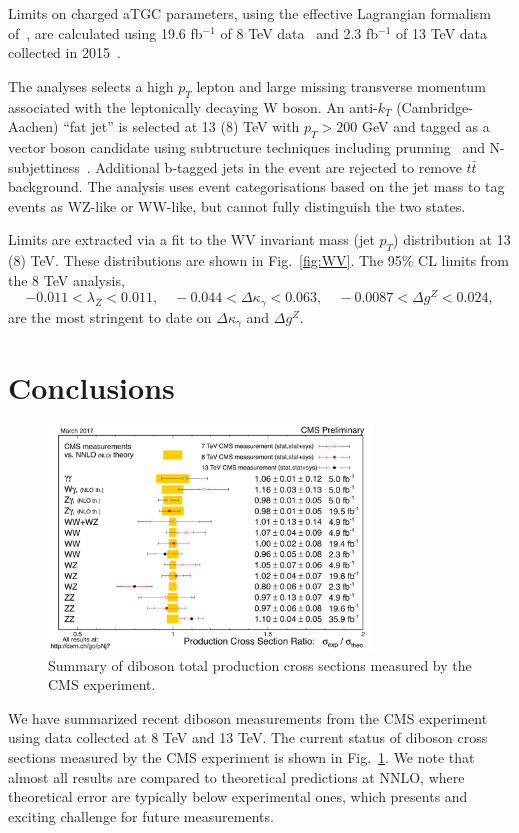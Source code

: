 \documentclass[10pt]{article}
\begin{document}
Limits on charged aTGC parameters, using the effective Lagrangian formalism 
of~\cite{Hagiwara:1993ck}, are calculated using 19.6 fb$^{-1}$ of 8 TeV 
data~\cite{CMS:2017ruh}
and 2.3 fb$^{-1}$ of 13 TeV data collected in 2015~\cite{Sirunyan:2017bey}.

The analyses selects a high $p_{T}$ lepton and large missing transverse momentum
associated with the leptonically decaying W boson. An anti-$k_{T}$
(Cambridge-Aachen) ``fat jet''  is selected at 13 (8) TeV with $p_{T} > 200$ GeV 
and tagged as a vector boson candidate using
subtructure techniques including prunning~\cite{Ellis:2009me} and 
N-subjettiness~\cite{Thaler:2010tr}. 
Additional b-tagged jets in the event are 
rejected to remove $t\bar{t}$ background. The analysis uses event categorisations
based on the jet mass to tag events as WZ-like or WW-like, but cannot fully 
distinguish the two states.

Limits are extracted via a fit to the WV invariant mass (jet $p_{T}$) distribution at 13 (8) TeV.
These distributions are shown in Fig.~\ref{fig:WV}.
The 95\% CL limits from the 8 TeV analysis,
\begin{equation}
  -0.011 < \lambda_{Z} < 0.011, \quad -0.044 < \Delta\kappa_{\gamma} < 0.063, \quad -0.0087 < \Delta g^{Z} < 0.024,
\end{equation}
are the most stringent to date on $\Delta\kappa_\gamma$ and $\Delta g^{Z}$.

\section{Conclusions}
\begin{figure}[htb]
  \centering
    \includegraphics[height=2.35in]{figures/CrossSectionSummary.pdf}
  \caption{ Summary of diboson total production cross sections measured by the CMS experiment. }
  \label{fig:xsecs}
\end{figure}


We have summarized recent diboson measurements from the CMS experiment using
data collected at 8 TeV and 13 TeV. The current status of diboson cross sections 
measured by the CMS experiment is shown in Fig.~\ref{fig:xsecs}. We note that 
almost all results are compared to theoretical predictions at NNLO, where theoretical 
error are typically below experimental ones, which presents and exciting challenge
for future measurements. 



\end{document}
